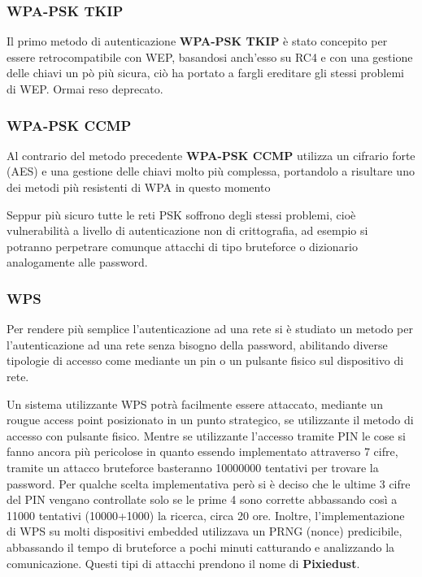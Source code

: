 \subsubsection{WPA-PSK TKIP}
Il primo metodo di autenticazione \textbf{WPA-PSK TKIP} è stato concepito per essere retrocompatibile con WEP, basandosi anch'esso su RC4 e con una gestione delle chiavi un pò più sicura, ciò ha portato a fargli ereditare gli stessi problemi di WEP. Ormai reso deprecato.

\subsubsection{WPA-PSK CCMP}
Al contrario del metodo precedente \textbf{WPA-PSK CCMP} utilizza un cifrario forte (AES) e una gestione delle chiavi molto più complessa, portandolo a risultare uno dei metodi più resistenti di WPA in questo momento

Seppur più sicuro tutte le reti PSK soffrono degli stessi problemi, cioè vulnerabilità a livello di autenticazione non di crittografia, ad esempio si potranno perpetrare comunque attacchi di tipo bruteforce o dizionario analogamente alle password.

\subsubsection{WPS}
Per rendere più semplice l'autenticazione ad una rete si è studiato un metodo per l'autenticazione ad una rete senza bisogno della password, abilitando diverse tipologie di accesso come mediante un pin o un pulsante fisico sul dispositivo di rete.

Un sistema utilizzante WPS potrà facilmente essere attaccato, mediante un rougue access point posizionato in un punto strategico, se utilizzante il metodo di accesso con pulsante fisico. Mentre se utilizzante l'accesso tramite PIN le cose si fanno ancora più pericolose in quanto essendo implementato attraverso 7 cifre, tramite un attacco bruteforce basteranno 10000000 tentativi per trovare la password. Per qualche scelta implementativa però si è deciso che le ultime 3 cifre del PIN vengano controllate solo se le prime 4 sono corrette abbassando così a 11000 tentativi (10000+1000) la ricerca, circa 20 ore.
Inoltre, l'implementazione di WPS su molti dispositivi embedded utilizzava un PRNG (nonce) predicibile, abbassando il tempo di bruteforce a pochi minuti catturando e analizzando la comunicazione.
Questi tipi di attacchi prendono il nome di \textbf{Pixiedust}.

